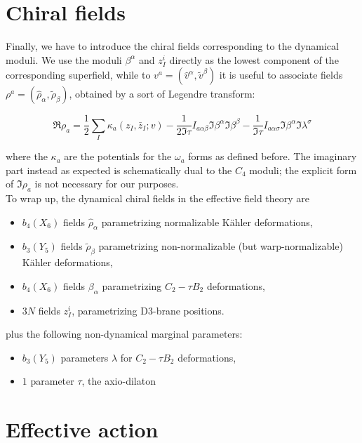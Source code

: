 \section{Chiral fields}

Finally, we have to introduce the chiral fields corresponding to the dynamical moduli. We use the moduli $\beta^\alpha$ and $z_I^i$ directly as the lowest component of the corresponding superfield, while to $v^a = (\hat v^\alpha,\tilde v^\beta)$ it is useful to associate fields $\rho^a = (\hat \rho_\alpha, \tilde \rho_\beta)$, obtained by a sort of Legendre transform:

\begin{equation}
	\Re{\rho_a} = \frac{1}{2}\sum_I \kappa_a(z_I, \bar z_I ; v) - \frac{1}{2 \Im \tau} I_{a\alpha\beta} \Im \beta^\alpha \Im \beta^\beta - \frac{1}{\Im \tau} I_{a\alpha\sigma} \Im \beta^\alpha \Im \lambda^\sigma
	\label{rhov}
\end{equation}

where the $\kappa_a$ are the potentials for the $\omega_a$ forms as defined before. The imaginary part instead as expected is schematically dual to the $C_4$ moduli; the explicit form of $\Im \rho_a$ is not necessary for our purposes.\\

To wrap up, the dynamical chiral fields in the effective field theory are 

\begin{itemize}
	\item $b_4(X_6)$ fields $\hat\rho_\alpha$ parametrizing normalizable K\"ahler deformations,
	\item $b_3(Y_5)$ fields $\tilde\rho_\beta$ parametrizing non-normalizable (but warp-normalizable) K\"ahler deformations,
	\item $b_4(X_6)$ fields $\beta_\alpha$ parametrizing $C_2 - \tau B_2$ deformations,
	\item $3N$ fields $z_I^i$, parametrizing D3-brane positions.
\end{itemize}

plus the following non-dynamical marginal parameters:

\begin{itemize}
	\item $b_3(Y_5)$ parameters $\lambda$ for $C_2 - \tau B_2$ deformations,
	\item $1$ parameter $\tau$, the axio-dilaton
\end{itemize}

\section{Effective action}

